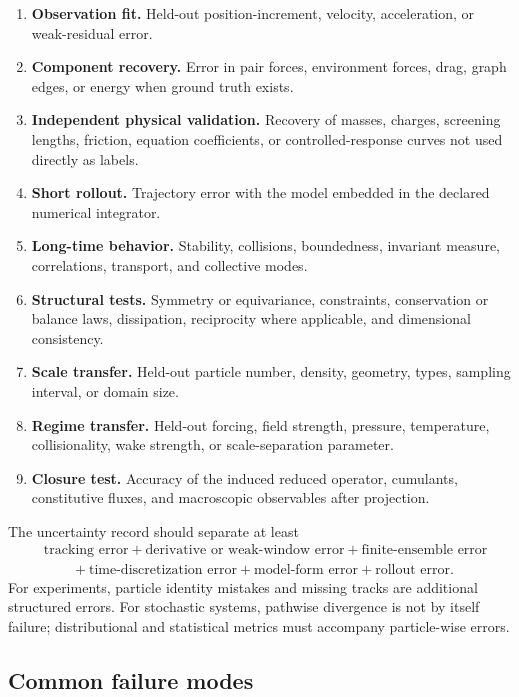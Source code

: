 \begin{enumerate}
  \item \textbf{Observation fit.} Held-out position-increment, velocity, acceleration, or weak-residual error.
  \item \textbf{Component recovery.} Error in pair forces, environment forces, drag, graph edges, or energy when ground truth exists.
  \item \textbf{Independent physical validation.} Recovery of masses, charges, screening lengths, friction, equation coefficients, or controlled-response curves not used directly as labels.
  \item \textbf{Short rollout.} Trajectory error with the model embedded in the declared numerical integrator.
  \item \textbf{Long-time behavior.} Stability, collisions, boundedness, invariant measure, correlations, transport, and collective modes.
  \item \textbf{Structural tests.} Symmetry or equivariance, constraints, conservation or balance laws, dissipation, reciprocity where applicable, and dimensional consistency.
  \item \textbf{Scale transfer.} Held-out particle number, density, geometry, types, sampling interval, or domain size.
  \item \textbf{Regime transfer.} Held-out forcing, field strength, pressure, temperature, collisionality, wake strength, or scale-separation parameter.
  \item \textbf{Closure test.} Accuracy of the induced reduced operator, cumulants, constitutive fluxes, and macroscopic observables after projection.
\end{enumerate}

The uncertainty record should separate at least
\begin{equation}
\begin{aligned}
&\text{tracking error}
+\text{derivative or weak-window error}
+\text{finite-ensemble error}
\\
&\qquad
+\text{time-discretization error}
+\text{model-form error}
+\text{rollout error}.
\end{aligned}
\end{equation}
For experiments, particle identity mistakes and missing tracks are additional structured errors. For stochastic systems, pathwise divergence is not by itself failure; distributional and statistical metrics must accompany particle-wise errors.

\subsection{Common failure modes}

